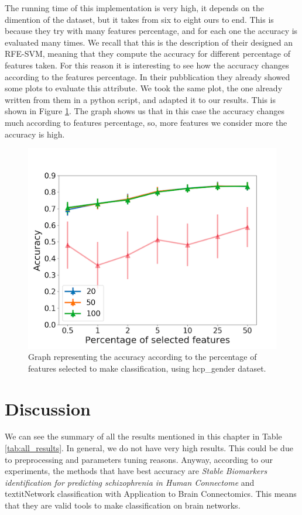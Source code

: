 The running time of this implementation is very high, it depends on the dimention of the dataset, but it takes from six to eight ours to end. This is because they try with many features percentage, and for each one the accuracy is evaluated many times. We recall that this is the description of their designed an RFE-SVM, meaning that they compute the accuracy for different percentage of features taken. For this reason it is interesting to see how the accuracy changes according to the features percentage. In their pubblication they already showed some plots to evaluate this attribute. We took the same plot, the one already written from them in a python script, and adapted it to our results. This is shown in Figure \ref{fig:diagram20}. The graph shows us that in this case the accuracy changes much according to features percentage, so, more features we consider more the accuracy is high. 

\begin{figure}[htbp]
	\centering
	\includegraphics[scale=0.5]{Immagini/fc_83_hcp_gender.png}
	\caption{Graph representing the accuracy according to the percentage of features selected to make classification, using hcp\_gender dataset.}
	\label{fig:diagram20}
\end{figure}

\newpage
\section{Discussion}

We can see the summary of all the results mentioned in this chapter in Table \ref{tab:all_results}. In general, we do not have very high results. This could be due to preprocessing and parameters tuning reasons. Anyway, according to our experiments, the methods that have best accuracy are \textit{Stable Biomarkers identification for predicting schizophrenia in Human Connectome} and textit{Network classification with Application to Brain Connectomics}. This means that they are valid tools to make classification on brain networks. 
\vspace{0.5cm}

